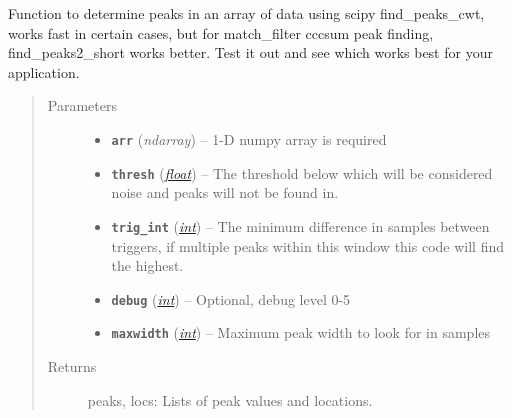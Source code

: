 \documentclass[a4paper,10pt,english]{sphinxmanual}
\begin{document}
\begin{fulllineitems}
\label{submodules/utils.findpeaks:findpeaks.find_peaks2}
Function to determine peaks in an array of data using scipy find\_peaks\_cwt,
works fast in certain cases, but for match\_filter cccsum peak finding,
find\_peaks2\_short works better.  Test it out and see which works best for
your application.
\begin{quote}\begin{description}
\item[{Parameters}] \leavevmode\begin{itemize}
\item {} 
\textbf{\texttt{arr}} (\emph{ndarray}) -- 1-D numpy array is required

\item {} 
\textbf{\texttt{thresh}} (\href{https://docs.python.org/library/functions.html\#float}{\emph{float}}) -- The threshold below which will be considered noise and peaks    will not be found in.

\item {} 
\textbf{\texttt{trig\_int}} (\href{https://docs.python.org/library/functions.html\#int}{\emph{int}}) -- The minimum difference in samples between triggers,    if multiple peaks within this window this code will find the highest.

\item {} 
\textbf{\texttt{debug}} (\href{https://docs.python.org/library/functions.html\#int}{\emph{int}}) -- Optional, debug level 0-5

\item {} 
\textbf{\texttt{maxwidth}} (\href{https://docs.python.org/library/functions.html\#int}{\emph{int}}) -- Maximum peak width to look for in samples

\end{itemize}

\item[{Returns}] \leavevmode
peaks, locs: Lists of peak values and locations.

\end{description}\end{quote}

\end{fulllineitems}

\end{document}
